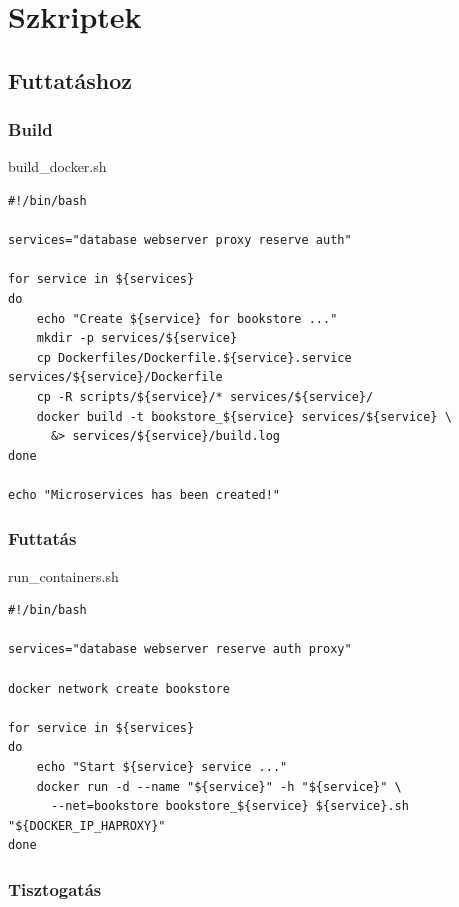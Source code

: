 \documentclass[11pt,magyar,a4paper,oneside,]{report}
\begin{document}
\section{Szkriptek}\label{szkriptek}

\subsection{Futtatáshoz}\label{futtatuxe1shoz}

\subsubsection{Build}\label{build}

build\_docker.sh

\begin{verbatim}
#!/bin/bash

services="database webserver proxy reserve auth"

for service in ${services}
do
    echo "Create ${service} for bookstore ..."
    mkdir -p services/${service}
    cp Dockerfiles/Dockerfile.${service}.service services/${service}/Dockerfile
    cp -R scripts/${service}/* services/${service}/
    docker build -t bookstore_${service} services/${service} \
      &> services/${service}/build.log
done

echo "Microservices has been created!"
\end{verbatim}

\subsubsection{Futtatás}\label{futtatuxe1s}

run\_containers.sh

\begin{verbatim}
#!/bin/bash

services="database webserver reserve auth proxy"

docker network create bookstore

for service in ${services}
do
    echo "Start ${service} service ..."
    docker run -d --name "${service}" -h "${service}" \
      --net=bookstore bookstore_${service} ${service}.sh "${DOCKER_IP_HAPROXY}"
done
\end{verbatim}

\subsubsection{Tisztogatás}\label{tisztogatuxe1s}
\end{document}
